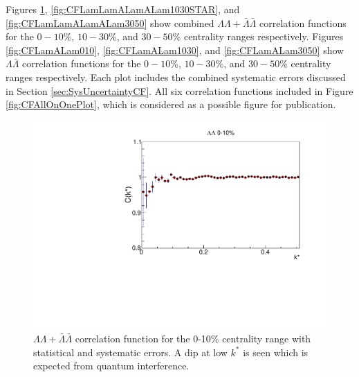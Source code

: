 Figures \ref{fig:CFLamLamALamALam010}, \ref{fig:CFLamLamALamALam1030STAR}, and \ref{fig:CFLamLamALamALam3050} show combined $\Lambda\Lambda + \bar{\Lambda}\bar{\Lambda}$ correlation functions for the $0-10$\%, $10-30$\%, and $30-50$\% centrality ranges respectively.  
Figures \ref{fig:CFLamALam010}, \ref{fig:CFLamALam1030}, and \ref{fig:CFLamALam3050} show $\Lambda\bar{\Lambda}$ correlation functions for the $0-10$\%, $10-30$\%, and $30-50$\% centrality ranges respectively.  
Each plot includes the combined systematic errors discussed in Section \ref{sec:SysUncertaintyCF}.
All six correlation functions included in Figure \ref{fig:CFAllOnOnePlot}, which is considered as a possible figure for publication.

\begin{figure}[hbtp]
\includegraphics[width=36pc]{Figures/CFs/2016-8-30-CFLLAA010CombinedSystematicsMaximum.pdf}
\caption[$\Lambda\Lambda + \bar{\Lambda}\bar{\Lambda}$ correlation function for the 0-10\% centrality range]{$\Lambda\Lambda + \bar{\Lambda}\bar{\Lambda}$ correlation function for the 0-10\% centrality range with statistical and systematic errors.  
A dip at low $k^*$ is seen which is expected from quantum interference.}
\label{fig:CFLamLamALamALam010}
\end{figure}

